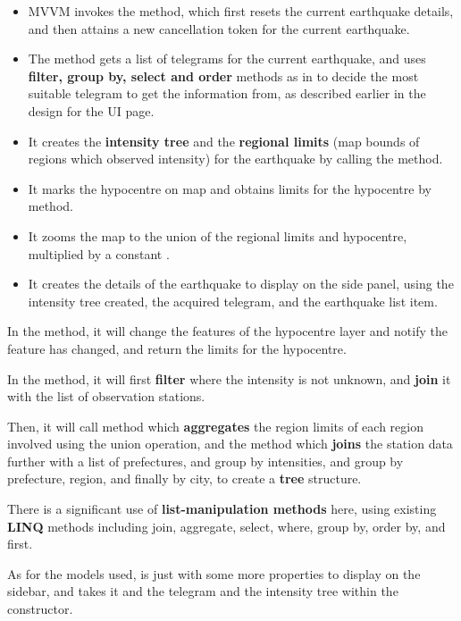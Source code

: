 \begin{itemize}
    \item MVVM invokes the  method, which first resets the current earthquake details, and then attains a new cancellation token for the current earthquake.
    \item The method gets a list of telegrams for the current earthquake, and uses \textbf{filter, group by, select and order} methods as in  to decide the most suitable telegram to get the information from, as described earlier in the design for the UI page.
    \item It creates the \textbf{intensity tree} and the \textbf{regional limits} (map bounds of regions which observed intensity) for the earthquake by calling the  method.
    \item It marks the hypocentre on map and obtains limits for the hypocentre by  method.
    \item It zooms the map to the union of the regional limits and hypocentre, multiplied by a constant .
    \item It creates the details of the earthquake to display on the side panel, using the intensity tree created, the acquired telegram, and the earthquake list item.
\end{itemize}

In the  method, it will change the features of the hypocentre layer and notify the feature has changed, and return the limits for the hypocentre.

In the  method, it will first \textbf{filter} where the intensity is not unknown, and \textbf{join} it with the list of observation stations.

Then, it will call method  which \textbf{aggregates} the region limits of each region involved using the union operation, and the  method which \textbf{joins} the station data further with a list of prefectures, and group by intensities, and group by prefecture, region, and finally by city, to create a \textbf{tree} structure.

There is a significant use of \textbf{list-manipulation methods} here, using existing \textbf{LINQ} methods including join, aggregate, select, where, group by, order by, and first.

As for the models used,  is just  with some more properties to display on the sidebar, and takes it and the telegram and the intensity tree within the constructor.

